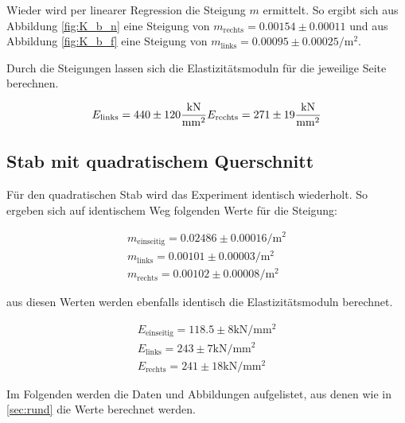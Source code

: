 \noindent Wieder wird per linearer Regression die Steigung $m$ ermittelt. So ergibt sich aus Abbildung \ref{fig:K_b_n} eine Steigung
von $m_\text{rechts}=0.00154 \pm 0.00011$ und aus Abbildung \ref{fig:K_b_f} eine Steigung von 
$m_\text{links}=0.00095\pm0.00025\unit{\per \meter \squared}$.

\noindent Durch die Steigungen lassen sich die Elastizitätsmoduln für die jeweilige Seite berechnen.

\begin{equation}
    E_\text{links} = 440 \pm 120 \unit{\kilo \newton \per \milli \meter \squared} \\
    E_\text{rechts} = 271 \pm 19 \unit{\kilo \newton \per \milli \meter \squared}
\end{equation}


\subsection{Stab mit quadratischem Querschnitt}
Für den quadratischen Stab wird das Experiment identisch wiederholt. 
So ergeben sich auf identischem Weg folgenden Werte für die Steigung:

\begin{align}
    m_\text{einseitig} = 0.02486 \pm 0.00016\unit{\per \meter \squared}  \\
    m_\text{links} = 0.00101\pm0.00003\unit{\per \meter \squared}        \\
    m_\text{rechts} = 0.00102\pm0.00008\unit{\per \meter \squared}
\end{align}

\noindent aus diesen Werten werden ebenfalls identisch die Elastizitätsmoduln berechnet.

\begin{align}
    E_\text{einseitig} =118.5   \pm 8\unit{\kilo \newton \per \milli \meter \squared}    \\
    E_\text{links} =    243    \pm 7\unit{\kilo \newton \per \milli \meter \squared}     \\
    E_\text{rechts} =   241    \pm 18\unit{\kilo \newton \per \milli \meter \squared}    
\end{align}

\noindent Im Folgenden werden die Daten und Abbildungen aufgelistet, aus denen wie in \autoref{sec:rund} die Werte berechnet werden.

